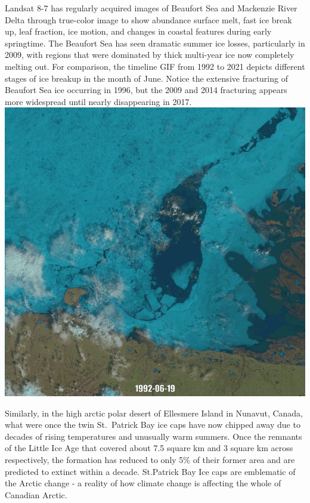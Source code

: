 \documentclass[
]{book}
\begin{document}
Landsat 8-7 has regularly acquired images of Beaufort Sea and Mackenzie River Delta through true-color image to show abundance surface melt, fast ice break up, leaf fraction, ice motion, and changes in coastal features during early springtime. The Beaufort Sea has seen dramatic summer ice losses, particularly in 2009, with regions that were dominated by thick multi-year ice now completely melting out. For comparison, the timeline GIF from 1992 to 2021 depicts different stages of ice breakup in the month of June. Notice the extensive fracturing of Beaufort Sea ice occurring in 1996, but the 2009 and 2014 fracturing appears more widespread until nearly disappearing in 2017.\\
\includegraphics{images/13-Beaufort-Sea-Ice.gif}

Similarly, in the high arctic polar desert of Ellesmere Island in Nunavut, Canada, what were once the twin St.~Patrick Bay ice caps have now chipped away due to decades of rising temperatures and unusually warm summers. Once the remnants of the Little Ice Age that covered about 7.5 square km and 3 square km across respectively, the formation has reduced to only 5\% of their former area and are predicted to extinct within a decade. St.Patrick Bay Ice caps are emblematic of the Arctic change - a reality of how climate change is affecting the whole of Canadian Arctic.

\hypertarget{container}{}
\end{document}
